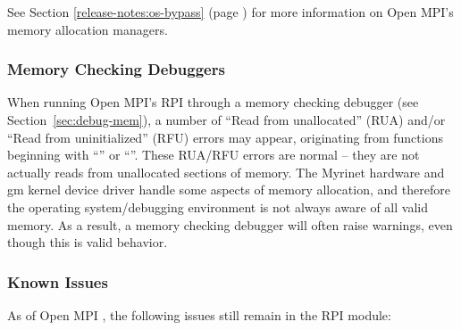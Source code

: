 See Section \ref{release-notes:os-bypass} (page
\pageref{release-notes:os-bypass}) for more information on Open MPI's
memory allocation managers.


\subsubsection{Memory Checking Debuggers}

When running Open MPI's  RPI through a memory checking debugger
(see Section~\ref{sec:debug-mem}), a number of ``Read from
unallocated'' (RUA) and/or ``Read from uninitialized'' (RFU) errors
may appear, originating from functions beginning with ``''
or ``''.  These RUA/RFU errors are
normal -- they are not actually reads from unallocated sections of
memory.  The Myrinet hardware and gm kernel device driver handle some
aspects of memory allocation, and therefore the operating
system/debugging environment is not always aware of all valid memory.
As a result, a memory checking debugger will often raise warnings,
even though this is valid behavior.


\subsubsection{Known Issues}

As of Open MPI \lamversion, the following issues still remain in the
 RPI module:

